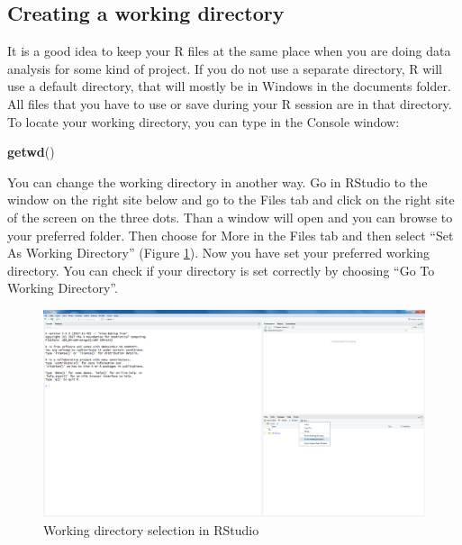 \documentclass[]{book}
\newenvironment{Shaded}{\begin{snugshade}}{\end{snugshade}}
\newcommand{\KeywordTok}[1]{\textcolor[rgb]{0.13,0.29,0.53}{\textbf{#1}}}
\newcommand{\NormalTok}[1]{#1}
\begin{document}
\subsection{Creating a working
directory}\label{creating-a-working-directory}

It is a good idea to keep your R files at the same place when you are
doing data analysis for some kind of project. If you do not use a
separate directory, R will use a default directory, that will mostly be
in Windows in the documents folder. All files that you have to use or
save during your R session are in that directory. To locate your working
directory, you can type in the Console window:

\begin{Shaded}
\begin{Highlighting}[]
\KeywordTok{getwd}\NormalTok{()}
\end{Highlighting}
\end{Shaded}

You can change the working directory in another way. Go in RStudio to
the window on the right site below and go to the Files tab and click on
the right site of the screen on the three dots. Than a window will open
and you can browse to your preferred folder. Then choose for More in the
Files tab and then select ``Set As Working Directory'' (Figure
\ref{fig:fig12}). Now you have set your preferred working directory. You
can check if your directory is set correctly by choosing ``Go To Working
Directory''.

\begin{figure}

{\centering \includegraphics[width=0.95\linewidth]{images/fig1.12} 

}

\caption{Working directory selection in RStudio}\label{fig:fig12}
\end{figure}
\end{document}
